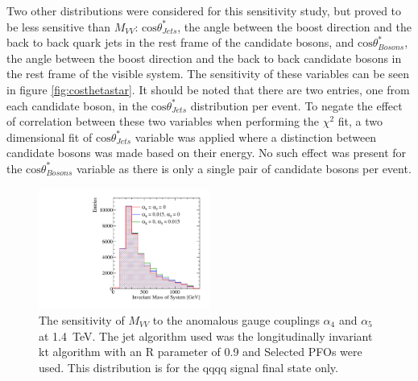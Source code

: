 Two other distributions were considered for this sensitivity study, but proved to be less sensitive than $M_{VV}$: $\text{cos}\theta^{*}_{Jets}$, the angle between the boost direction and the back to back quark jets in the rest frame of the candidate bosons, and $\text{cos}\theta^{*}_{Bosons}$, the angle between the boost direction and the back to back candidate bosons in the rest frame of the visible system.  The sensitivity of these variables can be seen in figure \ref{fig:costhetastar}.  It should be noted that there are two entries, one from each candidate boson, in the $\text{cos}\theta^{*}_{Jets}$ distribution per event.  To negate the effect of correlation between these two variables when performing the $\chi^{2}$ fit, a two dimensional fit of $\text{cos}\theta^{*}_{Jets}$ variable was applied where a distinction between candidate bosons was made based on their energy.  No such effect was present for the $\text{cos}\theta^{*}_{Bosons}$ variable as there is only a single pair of candidate bosons per event.

\begin{figure}[h!]
\centering
\includegraphics[width=0.5\textwidth]{PhysicsAnalysis/Plots/SensitiveDistributions/MVVs_SPFOs_kt_0p90_1400GeV.pdf}
\caption[The sensitivity of $M_{VV}$ to the anomalous gauge couplings $\alpha_{4}$ and $\alpha_{5}$ at 1.4~TeV.  The jet algorithm used was the longitudinally invariant kt algorithm with an R parameter of 0.9 and Selected PFOs were used.  This distribution is for the \nu{\nu}qqqq signal final state only.]{The sensitivity of $M_{VV}$ to the anomalous gauge couplings $\alpha_{4}$ and $\alpha_{5}$ at 1.4~TeV.  The jet algorithm used was the longitudinally invariant kt algorithm with an R parameter of 0.9 and Selected PFOs were used.  This distribution is for the \nu{\nu}qqqq signal final state only.}
\label{fig:mvv}
\end{figure}

